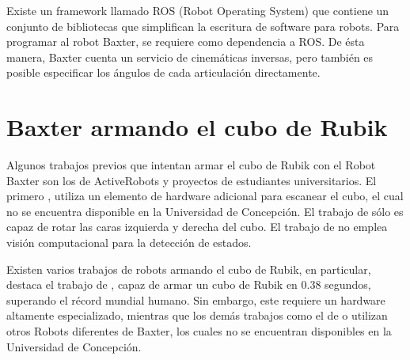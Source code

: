 Existe un framework llamado ROS (Robot Operating System)\cite{ros} que contiene un conjunto de bibliotecas que simplifican la escritura de software para robots.
Para programar al robot Baxter, se requiere como dependencia a ROS. De ésta manera, Baxter cuenta un servicio de cinemáticas inversas, pero también es posible especificar los ángulos de cada articulación directamente.


\section*{Baxter armando el cubo de Rubik}
Algunos trabajos previos que intentan armar el cubo de Rubik con el Robot Baxter son los de ActiveRobots y proyectos de estudiantes universitarios. El primero \cite{baxterrubik1}, utiliza un elemento de hardware adicional para escanear el cubo, el cual no se encuentra disponible en la Universidad de Concepción. El trabajo de \cite{baxterrubik3} sólo es capaz de rotar las caras izquierda y derecha del cubo. El trabajo de \cite{baxterrubik2} no emplea visión computacional para la detección de estados.

Existen varios trabajos de robots armando el cubo de Rubik, en particular, destaca el trabajo de \cite{mitrubikrobot}, capaz de armar un cubo de Rubik en 0.38 segundos, superando el récord mundial humano. Sin embargo, este requiere un hardware altamente especializado, mientras que los demás trabajos como el de \cite{robotother} o \cite{mrroc} utilizan otros Robots diferentes de Baxter, los cuales no se encuentran disponibles en la Universidad de Concepción.
